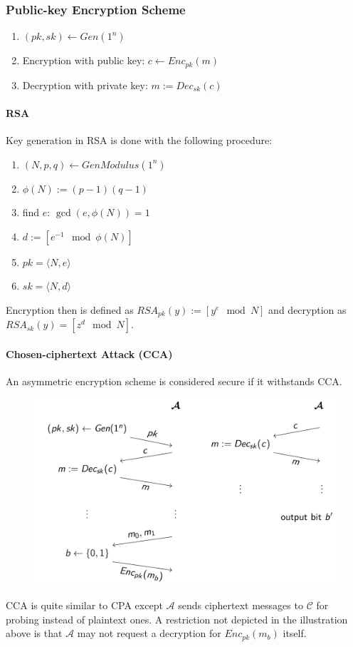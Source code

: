 \subsubsection{Public-key Encryption Scheme}
\begin{enumerate}
  \item $(pk,sk) \leftarrow Gen(1^n)$
  \item Encryption with public key: $c \leftarrow Enc_{pk}(m)$
  \item Decryption with private key: $m := Dec_{sk}(c)$
\end{enumerate}

\paragraph{RSA}
Key generation in RSA is done with the following procedure:
\begin{enumerate}
  \item $(N,p,q) \leftarrow GenModulus(1^n)$
  \item $\phi(N) := (p-1)(q-1)$
  \item find $e$: $\gcd(e,\phi(N)) = 1$
  \item $d := [e^{-1} \mod \phi(N)]$
  \item $pk = \langle N,e \rangle$
  \item $sk = \langle N,d \rangle$
\end{enumerate}

Encryption then is defined as $RSA_{pk}(y) := [y^e \mod N]$ and decryption as $RSA_{sk}(y) = [z^d \mod N]$.

\paragraph{Chosen-ciphertext Attack (CCA)}
An asymmetric encryption scheme is considered secure if it withstands CCA\@.
\begin{figure}[H]
  \centering
  \includegraphics[width=.8\textwidth]{figures/cca.png}
\end{figure}
CCA is quite similar to CPA except $\mathcal{A}$ sends ciphertext messages to $\mathcal{C}$ for probing instead of plaintext ones.
A restriction not depicted in the illustration above is that $\mathcal{A}$ may not request a decryption for $Enc_{pk}(m_b)$ itself.
\newpage


